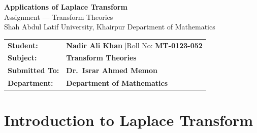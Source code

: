 \documentclass[12pt]{article}
\begin{document}
\thispagestyle{empty}

\begin{tcolorbox}[
  enhanced, arc=0pt, boxrule=0pt,
  colback=primary, colframe=primary,
  left=16pt, right=16pt, top=18pt, bottom=14pt,
  borderline south={4pt}{0pt}{accent},
]
  \centering
  {\huge\bfseries\color{white} Applications of Laplace Transform}\\[4pt]
  {\large\color{accent} Assignment --- Transform Theories}\\[6pt]
  {\normalsize\color{lightbg}
    Shah Abdul Latif University, Khairpur \quad\textbullet\quad Department of Mathematics}
\end{tcolorbox}

\vspace{4pt}

\begin{tcolorbox}[
  enhanced, arc=0pt, boxrule=0pt,
  colback=white, colframe=white,
  borderline north={1.5pt}{0pt}{accent!60},
  borderline south={1.5pt}{0pt}{accent!60},
  left=16pt, right=16pt, top=12pt, bottom=12pt,
]
  \begin{tabular}{p{3.8cm} p{9cm}}
    \textcolor{primary}{\textbf{Student:}}
      & \textbf{Nadir Ali Khan} \quad|\quad Roll No: \textbf{MT-0123-052} \\[4pt]
    \textcolor{primary}{\textbf{Subject:}}
      & \textbf{Transform Theories} \\[4pt]
    \textcolor{primary}{\textbf{Submitted To:}}
      & \textbf{Dr.\ Israr Ahmed Memon} \\[4pt]
    \textcolor{primary}{\textbf{Department:}}
      & \textbf{Department of Mathematics} \\
  \end{tabular}
\end{tcolorbox}

\vspace{10pt}

\renewcommand{\contentsname}{\color{primary}Table of Contents}
\tableofcontents

\newpage

\section{Introduction to Laplace Transform}
\end{document}
